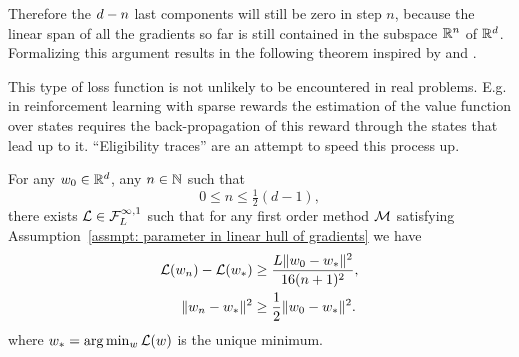 Therefore the \(\dimension - n\) last components will still be zero in
step \(n\), because the linear span of all the gradients so far is still
contained in the subspace \(\reals^n\) of \(\reals^\dimension\). Formalizing
this argument results in the following theorem inspired by \textcite[Theorem
2.1.7]{nesterovLecturesConvexOptimization2018} and \textcite{gohWhyMomentumReally2017}.

\begin{remark}
	This type of loss function is not unlikely to be encountered in real
	problems. E.g. in reinforcement learning with sparse rewards the estimation
	of the value function over states requires the back-propagation of this
	reward through the states that lead up to it. ``Eligibility traces''
	\parencite[Chapter 12]{suttonReinforcementLearningIntroduction2018}
	are an attempt to speed this process up.
\end{remark}
\begin{theorem}
	\label{thm: convex function complexity bound}
	For any \(\weights_0\in\reals^d\), any \(n\in\naturals\) such that 
	\[0\le n\le \tfrac12 (d-1),\]
	there exists \(\Loss\in\lipGradientSet[\infty,1]{\ubound}\)
	such that for any first order method \(\firstOrderMethod\)
	satisfying Assumption~\ref{assmpt: parameter in linear hull of gradients}
	we have
	\begin{subequations}
	\begin{align}
		\Loss(\weights_n) - \Loss(\minimum)
		&\ge \frac{\ubound \|\weights_0 - \minimum\|^2}{16(n+1)^2}, \\
		\|\weights_n -\minimum\|^2 
		&\ge \frac12 \|\weights_0 - \minimum\|^2.
	\end{align}
	\end{subequations}
	where \(\minimum = \arg\min_\weights \Loss(\weights)\) is the unique minimum.
\end{theorem}
